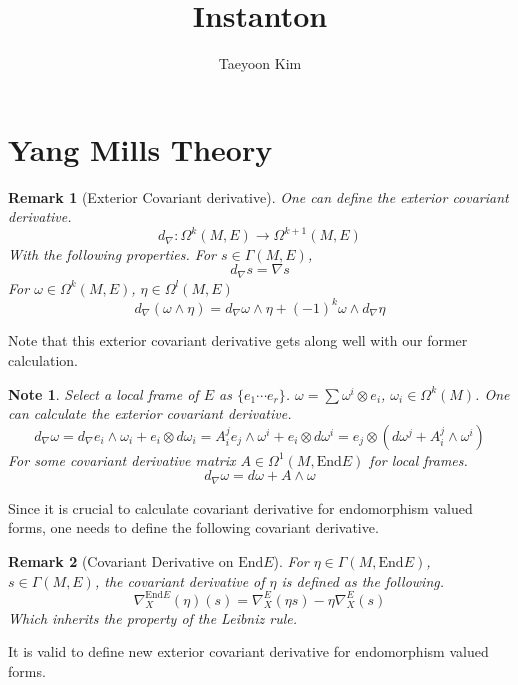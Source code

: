 \documentclass{article}
\title{Instanton}
\author{Taeyoon Kim}
\date{}
\newtheorem{rem}{Remark}
\newtheorem{note}{Note}
\begin{document}
\maketitle

\section*{Yang Mills Theory}

\begin{rem}[Exterior Covariant derivative]
    One can define the exterior covariant derivative. 
    \[
        d_\nabla: \Omega^k(M,E)\rightarrow \Omega^{k+1}(M,E)
    \]
    With the following properties. For $s\in \Gamma(M,E)$,
    \[
        d_\nabla s = \nabla s 
    \]
    For $\omega\in \Omega^k(M,E)$, $\eta \in \Omega^l(M,E)$
    \[
        d_\nabla(\omega \wedge \eta ) = d_\nabla \omega \wedge \eta + (-1)^k \omega \wedge d_\nabla \eta
    \]
\end{rem}

Note that this exterior covariant derivative gets along well with our former calculation. 

\begin{note}
    Select a local frame of $E$ as $\{e_1\cdots e_r\}$. 
    $\omega = \sum \omega^i\otimes e_i$, $\omega_i \in \Omega^k(M)$. One can calculate the exterior covariant derivative.
    \[
        d_\nabla \omega = d_\nabla e_i \wedge \omega_i + e_i \otimes d\omega_i = A^j_i e_j \wedge \omega^i + e_i \otimes d\omega^i = e_j \otimes (d\omega^j + A^j_i \wedge \omega^i)
    \]
    For some covariant derivative matrix $A\in\Omega^1(M,\mathrm{End} E)$ for local frames. 
    \[
        d_\nabla \omega = d\omega + A\wedge \omega
    \]
\end{note}

Since it is crucial to calculate covariant derivative for endomorphism valued forms, one needs to define the following covariant derivative. 

\begin{rem}[Covariant Derivative on $\mathrm{End}E$]
    For $\eta\in \Gamma(M,\mathrm{End}E)$, $s\in \Gamma(M,E)$, the covariant derivative of $\eta$ is defined as the following. 
    \[
        \nabla^{\mathrm{End}E}_X(\eta) (s) = \nabla_X^E(\eta s) - \eta \nabla_X^E(s)
    \]
    Which inherits the property of the Leibniz rule. 
\end{rem}

It is valid to define new exterior covariant derivative for endomorphism valued forms. 
\end{document}

